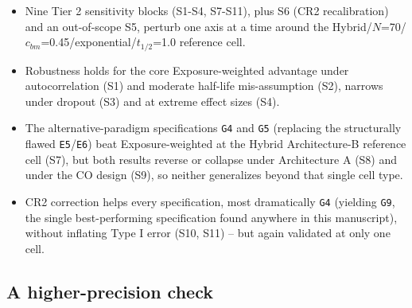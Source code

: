 \documentclass[
  11pt,
]{article}
\providecommand{\tightlist}{%
  \setlength{\itemsep}{0pt}\setlength{\parskip}{0pt}}
\begin{document}
\begin{itemize}
\tightlist
\item
  Nine Tier 2 sensitivity blocks (S1-S4, S7-S11), plus S6 (CR2
  recalibration) and an out-of-scope S5, perturb one axis at a time
  around the Hybrid/\(N\)=70/\(c_{bm}\)=0.45/exponential/\(t_{1/2}\)=1.0
  reference cell.
\item
  Robustness holds for the core Exposure-weighted advantage under
  autocorrelation (S1) and moderate half-life mis-assumption (S2),
  narrows under dropout (S3) and at extreme effect sizes (S4).
\item
  The alternative-paradigm specifications \texttt{G4} and \texttt{G5} (replacing
  the structurally flawed \texttt{E5}/\texttt{E6}) beat Exposure-weighted at the
  Hybrid Architecture-B reference cell (S7), but both results reverse
  or collapse under Architecture A (S8) and under the CO design (S9),
  so neither generalizes beyond that single cell type.
\item
  CR2 correction helps every specification, most dramatically \texttt{G4}
  (yielding \texttt{G9}, the single best-performing specification found
  anywhere in this manuscript), without inflating Type I error (S10,
  S11) -- but again validated at only one cell.
\end{itemize}

\subsection{A higher-precision check}\label{a-higher-precision-check}
\end{document}
